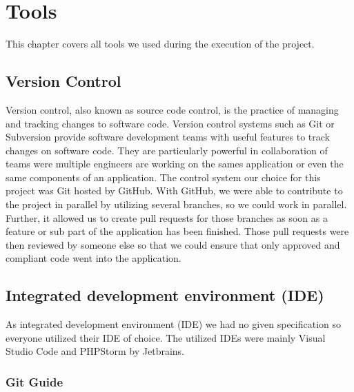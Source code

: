 \chapter{Tools}\label{ch:tools}

This chapter covers all tools we used during the execution of the project.


\section{Version Control}\label{sec:version-control}

Version control, also known as source code control, is the practice of managing and tracking changes to software code.
Version control systems such as Git or Subversion provide software development teams with useful features to track
changes on software code.
They are particularly powerful in collaboration of teams were multiple engineers are working on the sames application
or even the same components of an application.
The control system our choice for this project was Git hosted by GitHub.
With GitHub, we were able to contribute to the project in parallel by utilizing several branches, so we could work in
parallel.
Further, it allowed us to create pull requests for those branches as soon as a feature or sub part of the application
has been finished.
Those pull requests were then reviewed by someone else so that we could ensure that only approved and compliant code
went into the application.

\section{Integrated development environment (IDE)}\label{sec:integrated-development-environment-(ide)}

As integrated development environment (IDE) we had no given specification so everyone utilized their IDE of choice.
The utilized IDEs were mainly Visual Studio Code and PHPStorm by Jetbrains.

\subsection{Git Guide}\label{subsec:git-guide}

